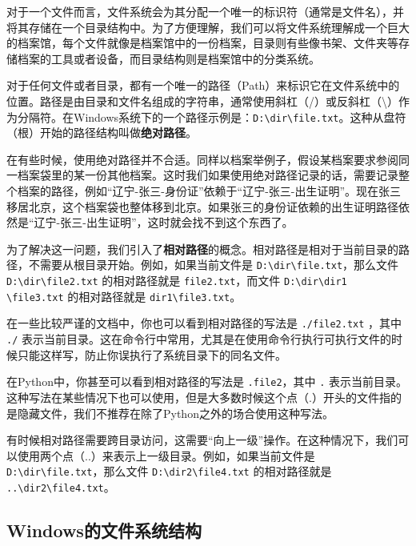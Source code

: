 \documentclass[../main.tex]{subfiles}
\begin{document}
对于一个文件而言，文件系统会为其分配一个唯一的标识符（通常是文件名），并将其存储在一个目录结构中。为了方便理解，我们可以将文件系统理解成一个巨大的档案馆，每个文件就像是档案馆中的一份档案，目录则有些像书架、文件夹等存储档案的工具或者设备，而目录结构则是档案馆中的分类系统。

对于任何文件或者目录，都有一个唯一的路径（Path）来标识它在文件系统中的位置。路径是由目录和文件名组成的字符串，通常使用斜杠（/）或反斜杠（\textbackslash）作为分隔符。在Windows系统下的一个路径示例是：\texttt{D:\textbackslash dir\textbackslash file.txt}。这种从盘符（根）开始的路径结构叫做\textbf{绝对路径}。

在有些时候，使用绝对路径并不合适。同样以档案举例子，假设某档案要求参阅同一档案袋里的某一份其他档案。这时我们如果使用绝对路径记录的话，需要记录整个档案的路径，例如“辽宁-张三-身份证”依赖于“辽宁-张三-出生证明”。现在张三移居北京，这个档案袋也整体移到北京。如果张三的身份证依赖的出生证明路径依然是“辽宁-张三-出生证明”，这时就会找不到这个东西了。

为了解决这一问题，我们引入了\textbf{相对路径}的概念。相对路径是相对于当前目录的路径，不需要从根目录开始。例如，如果当前文件是 \texttt{D:\textbackslash dir\textbackslash file.txt}，那么文件 \texttt{D:\textbackslash dir\textbackslash file2.txt} 的相对路径就是 \texttt{file2.txt}，而文件 \texttt{D:\textbackslash dir\textbackslash dir1 \textbackslash file3.txt} 的相对路径就是 \texttt{dir1\textbackslash file3.txt}。

在一些比较严谨的文档中，你也可以看到相对路径的写法是 \texttt{./file2.txt} ，其中 \texttt{./} 表示当前目录。这在命令行中常用，尤其是在使用命令行执行可执行文件的时候只能这样写，防止你误执行了系统目录下的同名文件。

在Python中，你甚至可以看到相对路径的写法是 \texttt{.file2}，其中 \texttt{.} 表示当前目录。这种写法在某些情况下也可以使用，但是大多数时候这个点（.）开头的文件指的是隐藏文件，我们不推荐在除了Python之外的场合使用这种写法。

有时候相对路径需要跨目录访问，这需要“向上一级”操作。在这种情况下，我们可以使用两个点（..）来表示上一级目录。例如，如果当前文件是 \texttt{D:\textbackslash dir\textbackslash file.txt}，那么文件 \texttt{D:\textbackslash dir2\textbackslash file4.txt} 的相对路径就是 \texttt{..\textbackslash dir2\textbackslash file4.txt}。

\subsection{Windows的文件系统结构}
\end{document}
